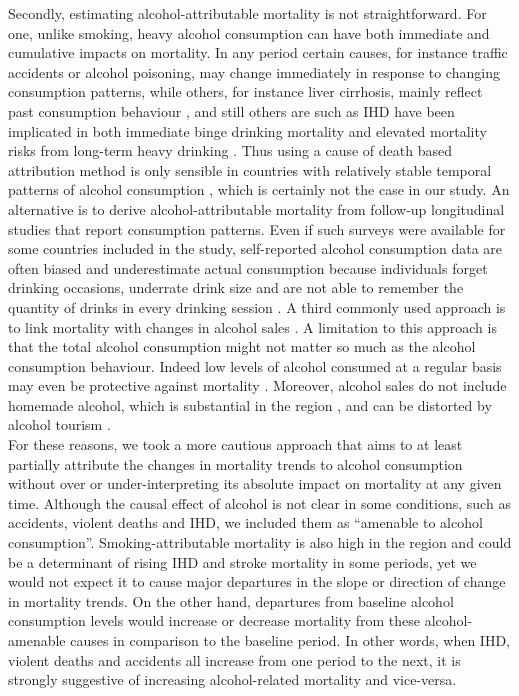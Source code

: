 \documentclass{article}
\begin{document}
\begin{spacing}{1.5}
Secondly, estimating alcohol-attributable mortality is not straightforward. For one, unlike smoking, heavy alcohol consumption can have both immediate and cumulative impacts on mortality. In any period certain causes, for instance traffic accidents or alcohol poisoning, may change immediately in response to changing consumption patterns, while others, for instance liver cirrhosis, mainly reflect past consumption behaviour \citep{ menon2001pathogenesis, rehm2003relationship}, and still others are such as IHD have been implicated in both immediate binge drinking mortality \citep{kauhanen1997beer} and elevated mortality risks from long-term heavy drinking \citep{roerecke2014alcohol}. Thus using a cause of death based attribution method is only sensible in countries with relatively stable temporal patterns of alcohol consumption \citep{kraus2015changes,martikainen2014income}, which is certainly not the case in our study. An alternative is to derive alcohol-attributable mortality from follow-up longitudinal studies that report consumption patterns. Even if such surveys were available for some countries included in the study, self-reported alcohol consumption data are often biased and underestimate actual consumption because individuals forget drinking occasions, underrate drink size and are not able to remember the quantity of drinks in every drinking session \citep{livingston2015underreporting,bellis2009off}. A third commonly used approach is to link mortality with changes in alcohol sales \citep{ evgeny2010beverage}. A limitation to this approach is that the total alcohol consumption might not matter so much as the alcohol consumption behaviour. Indeed low levels of alcohol consumed at a regular basis may even be protective against mortality \citep{bell2017,rehm2010relation, klatsky1974alcohol, roerecke2014alcohol}. Moreover, alcohol sales do not include homemade alcohol, which is substantial in the region \citep{popova2007comparing,mckee2005composition}, and can be distorted by alcohol tourism \citep{makela2009weakening,rabinovich2009affordability}. \\

For these reasons, we took a more cautious approach that aims to at least partially attribute the changes in mortality trends to alcohol consumption without over or under-interpreting its absolute impact on mortality at any given time. Although the causal effect of alcohol is not clear in some conditions, such as accidents, violent deaths and IHD, we included them as ``amenable to alcohol consumption''. Smoking-attributable mortality is also high in the region \citep{ezzati2003estimates} and could be a determinant of rising IHD and stroke mortality in some periods, yet we would not expect it to cause major departures in the slope or direction of change in mortality trends.  On the other hand, departures from baseline alcohol consumption levels would increase or decrease mortality from these alcohol-amenable causes in comparison to the baseline period. In other words, when IHD, violent deaths and accidents all increase from one period to the next, it is strongly suggestive of increasing alcohol-related mortality and vice-versa. \\


\end{spacing}
\end{document}
